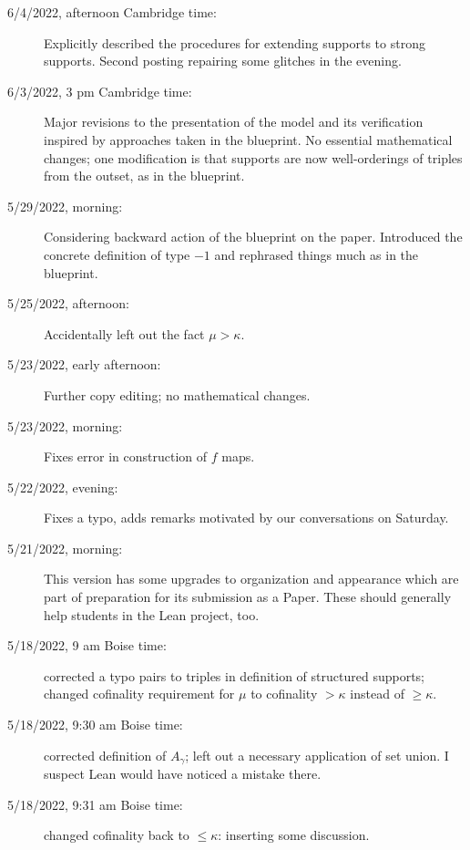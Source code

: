 \documentclass[112pt]{article}
\begin{document}
\begin{description}
\item[6/4/2022, afternoon Cambridge time:]  Explicitly described the procedures for extending supports to strong supports.  Second posting repairing some glitches in the evening.

\item[6/3/2022, 3 pm Cambridge time:]  Major revisions to the presentation of the model and its verification inspired by approaches taken in the blueprint.  No essential mathematical changes;  one modification is that supports are now well-orderings of triples from the outset, as in the blueprint.

\item[5/29/2022, morning:]  Considering backward action of the blueprint on the paper.  Introduced the concrete definition of type $-1$ and rephrased things much as in the blueprint.

\item[5/25/2022, afternoon:]  Accidentally left out the fact $\mu>\kappa$.

\item[5/23/2022, early afternoon:]  Further copy editing;  no mathematical changes.

\item[5/23/2022, morning:]  Fixes error in construction of $f$ maps.

\item[5/22/2022, evening:]  Fixes a typo, adds remarks motivated by our conversations on Saturday.

\item[5/21/2022, morning:]  This version has some upgrades to organization and appearance which are part of preparation for its submission as a Paper.  These should generally help students in the Lean project, too.

\item[5/18/2022, 9 am Boise time:]  corrected a typo pairs to triples in definition of structured supports;  changed cofinality requirement for
$\mu$ to cofinality $>\kappa$ instead of $\geq \kappa$.

\item[5/18/2022, 9:30 am Boise time:]  corrected definition of $A_\gamma$;  left out a necessary application of set union.  I suspect Lean would have noticed a mistake there.

\item[5/18/2022, 9:31 am Boise time:]  changed cofinality back to $\leq \kappa$:  inserting some discussion.

\end{description}
\end{document}
